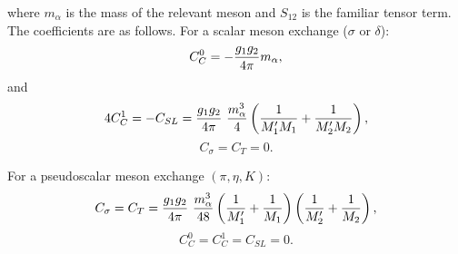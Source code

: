 where $m_{\alpha}$ is the mass of the relevant meson and
$S_{12}$ is the familiar tensor term.
The coefficients are as
follows.  For a scalar meson exchange ($\sigma$ or $\delta$):
\begin{equation}
C^0_C = - {g_1 g_2\over 4\pi} m_\alpha,
\end{equation}
and
\begin{equation}
4C^1_C = - C_{SL} = {g_1 g_2\over 4\pi}\ {m^3_\alpha\over 4}
\left( {1\over
M'_1M_1} + {1\over M'_2M_2}\right) ,
\end{equation}
\begin{equation}
C_\sigma = C_T = 0.
\end{equation}

For a pseudoscalar meson exchange $(\pi,\eta ,K)$:
\begin{equation}
C_\sigma =C_T = {g_1g_2\over 4\pi}\ {m^3_\alpha\over 48} \left(
{1\over M'_1} + {1\over M_1}\right) \left( {1\over M'_2}+{1\over M_2}\right),
\end{equation}
\begin{equation}
C^0_C = C^1_C = C_{SL} = 0.
\end{equation}

